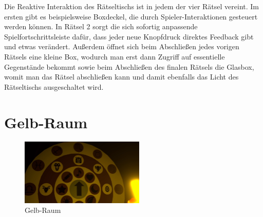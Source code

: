 \noindent Die Reaktive Interaktion des Rätseltischs ist in jedem der vier Rätsel vereint. Im ersten gibt es beispielsweise Boxdeckel, die durch Spieler-Interaktionen gesteuert werden können. In Rätsel 2 sorgt die sich sofortig anpassende Spielfortschrittsleiste dafür, dass jeder neue Knopfdruck direktes Feedback gibt und etwas verändert. Außerdem öffnet sich beim Abschließen jedes vorigen Rätsels eine kleine Box, wodurch man erst dann Zugriff auf essentielle Gegenstände bekommt sowie beim Abschließen des finalen Rätsels die Glasbox, womit man das Rätsel abschließen kann und damit ebenfalls das Licht des Rätseltischs ausgeschaltet wird.
\newpage
\noindent
\section{Gelb-Raum}
\begin{figure}
	\vspace*{-1cm}
	\includegraphics[width=5.9cm]{Pictures/Gelb-Raum}
	\caption{Gelb-Raum}
	\vspace*{-1cm}
	\label{fig:Gelb-Raum}
\end{figure}
